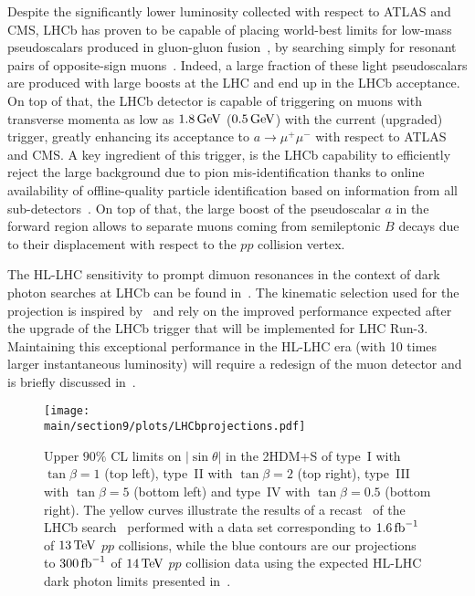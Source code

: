 Despite the significantly lower luminosity collected with respect to ATLAS and CMS, LHCb has proven to be capable of placing world-best limits for low-mass pseudoscalars produced in gluon-gluon fusion~\cite{Haisch:2016hzu,Haisch:2018kqx}, by searching simply for resonant pairs of opposite-sign muons~\cite{Aaij:2017rft, Aaij:2018xpt}. Indeed, a large fraction of these light pseudoscalars are produced with large boosts at the LHC and end up in the LHCb acceptance. On top of that, the LHCb detector is capable of triggering on muons with transverse momenta as low as $1.8 \, {\rm GeV}$ ($0.5 \, {\rm GeV}$) with the current (upgraded) trigger, greatly enhancing its acceptance to $a\to\mu^+\mu^-$ with respect to ATLAS and CMS. A key ingredient of this trigger, is the LHCb capability to efficiently reject  the large background due to pion mis-identification thanks to online availability of offline-quality particle identification based on information from all sub-detectors~\cite{Aaij:2016rxn, Dujany:2015lxd}. On top of that, the large boost of the pseudoscalar $a$  in the forward region allows to separate muons coming from semileptonic $B$ decays due to their displacement with respect to the $pp$ collision vertex. 

The HL-LHC sensitivity to prompt dimuon resonances in the context of dark photon searches at LHCb can be found in~\cite{Bediaga:2018lhg}. The kinematic selection used for the projection is inspired by~\cite{Ilten:2016tkc} and rely on the improved performance expected after the upgrade of the LHCb trigger that will be implemented for LHC Run-3. Maintaining this exceptional performance in the HL-LHC era (\ie with 10 times larger instantaneous luminosity) will require a redesign of the muon detector and is briefly discussed in~\cite{Bediaga:2018lhg}.

\begin{figure}[ht!]
\centering
\texttt{[image: \\main/section9/plots/LHCbprojections.pdf]}
\vspace{2mm}
\caption{Upper $90\%$ CL limits on $|\!\sin\theta|$ in the 2HDM+S of type~I with $\tan\beta =1$ (top left), type~II with $\tan\beta =2$ (top right), type~III with $\tan\beta = 5$ (bottom left) and type~IV with $\tan\beta = 0.5$ (bottom right). The yellow curves illustrate the results of a recast~\cite{Haisch:2018kqx} of the LHCb search~\cite{Aaij:2017rft} performed with a data set corresponding to $1.6\, {\rm fb}^{-1}$ of $13 \, {\rm TeV}$ $pp$ collisions, while the blue contours are our projections to $300 \, {\rm fb}^{-1}$ of $14 \, {\rm TeV}$ $pp$ collision data using the expected HL-LHC dark photon limits presented in~\cite{Bediaga:2018lhg}. }\label{fig:lhcb_lightmumu}
\end{figure}

